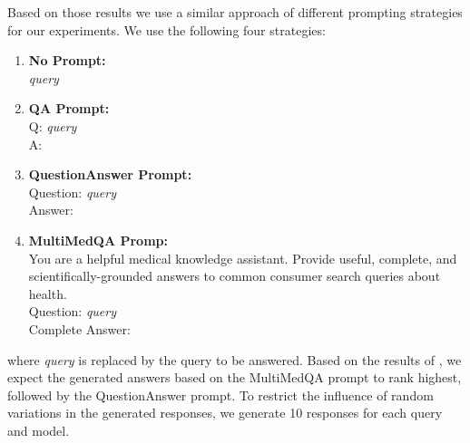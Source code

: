 Based on those results we use a similar approach of different prompting strategies for our experiments.
We use the following four strategies:
\begin{enumerate}
    \item \textbf{No Prompt:}\\ \textit{query}
    \item \textbf{QA Prompt:}\\ Q: \textit{query}\\A:
    \item \textbf{QuestionAnswer Prompt:}\\ Question: \textit{query}\\Answer:
    \item \textbf{MultiMedQA Promp:}\\ You are a helpful medical knowledge assistant. Provide useful, complete, and scientifically-grounded answers to common consumer search queries about health.\\Question: \textit{query}\\Complete Answer:
\end{enumerate}
where \textit{query} is replaced by the query to be answered.
Based on the results of \cite{reynolds:2021:Prompt}, we expect the generated answers based on the MultiMedQA prompt to rank highest, followed by the QuestionAnswer prompt.
To restrict the influence of random variations in the generated responses, we generate 10 responses for each query and model.

